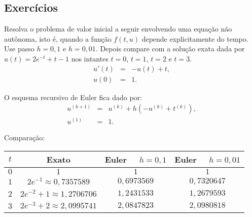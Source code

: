 \subsection*{Exercícios}
\begin{exer} Resolva o problema de valor inicial a seguir envolvendo uma equação não autônoma, isto é, quando a função $f(t,u)$ depende explicitamente do tempo. Use passo $h=0,1$ e $h=0,01$. Depois compare com a solução exata dada por $u(t)=2e^{-t}+t-1$ nos intantes $t=0$, $t=1$, $t=2$ e $t=3$.
  \begin{eqnarray*}
    u'(t)&=&-u(t)+t,\\
    u(0)&=&1.
  \end{eqnarray*}
\end{exer}
\begin{resp}
O esquema recursivo de Euler fica dado por:
\begin{eqnarray*}
  u^{(k+1)}&=&u^{(k)}+h(-u^{(k)}+t^{(k)}),\\
  u^{(1)}&=&1.
\end{eqnarray*}

Comparação:
\begin{center}
\begin{tabular}{|c|c|c|c|}\hline
$t$ &  Exato & Euler~~ $h=0,1$ & Euler~~ $h=0,01$\\\hline
$0$ &  $1$ & $1$ & $1$\\\hline
$1$ &   $2e^{-1}\approx 0,7357589$ & $0,6973569$   &   $0,7320647$  \\\hline
$2$ &   $2e^{-2}+1\approx  1,2706706$ & $ 1,2431533 $   &  $ 1,2679593$     \\\hline
$3$ &   $2e^{-3}+2\approx 2,0995741$  & $ 2,0847823$ & $2,0980818$   \\\hline
\end{tabular}
\end{center}
\end{resp}

